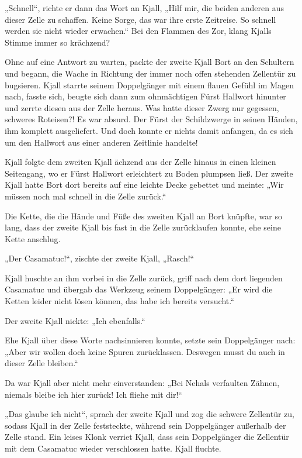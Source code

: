 „Schnell“, richte er dann das Wort an Kjall, „Hilf mir, die beiden anderen aus dieser Zelle zu schaffen. Keine Sorge, das war ihre erste Zeitreise. So schnell werden sie nicht wieder erwachen.“ Bei den Flammen des Zor, klang Kjalls Stimme immer so krächzend?

Ohne auf eine Antwort zu warten, packte der zweite Kjall Bort an den Schultern und begann, die Wache in Richtung der immer noch offen stehenden Zellentür zu bugsieren. Kjall starrte seinem Doppelgänger mit einem flauen Gefühl im Magen nach, fasste sich, beugte sich dann zum ohnmächtigen Fürst Hallwort hinunter und zerrte diesen aus der Zelle heraus. Was hatte dieser Zwerg nur gegessen, schweres Roteisen?! Es war absurd. Der Fürst der Schildzwerge in seinen Händen, ihm komplett ausgeliefert. Und doch konnte er nichts damit anfangen, da es sich um den Hallwort aus einer anderen Zeitlinie handelte!

Kjall folgte dem zweiten Kjall ächzend aus der Zelle hinaus in einen kleinen Seitengang, wo er Fürst Hallwort erleichtert zu Boden plumpsen ließ. Der zweite Kjall hatte Bort dort bereits auf eine leichte Decke gebettet und meinte: „Wir müssen noch mal schnell in die Zelle zurück.“

Die Kette, die die Hände und Füße des zweiten Kjall an Bort knüpfte, war so lang, dass der zweite Kjall bis fast in die Zelle zurücklaufen konnte, ehe seine Kette anschlug.

„Der Casamatuc!“, zischte der zweite Kjall, „Rasch!“

Kjall huschte an ihm vorbei in die Zelle zurück, griff nach dem dort liegenden Casamatuc und übergab das Werkzeug seinem Doppelgänger: „Er wird die Ketten leider nicht lösen können, das habe ich bereits versucht.“

Der zweite Kjall nickte: „Ich ebenfalls.“

Ehe Kjall über diese Worte nachsinnieren konnte, setzte sein Doppelgänger nach: „Aber wir wollen doch keine Spuren zurücklassen. Deswegen musst du auch in dieser Zelle bleiben.“

Da war Kjall aber nicht mehr einverstanden: „Bei Nehals verfaulten Zähnen, niemals bleibe ich hier zurück! Ich fliehe mit dir!“

„Das glaube ich nicht“, sprach der zweite Kjall und zog die schwere Zellentür zu, sodass Kjall in der Zelle feststeckte, während sein Doppelgänger außerhalb der Zelle stand. Ein leises Klonk verriet Kjall, dass sein Doppelgänger die Zellentür mit dem Casamatuc wieder verschlossen hatte. Kjall fluchte.

